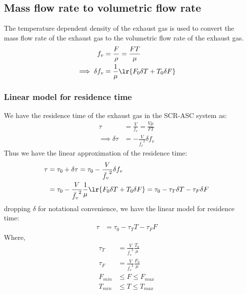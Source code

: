 \subsection{Mass flow rate to volumetric flow rate}
The temperature dependent density of the exhaust gas is used to convert the mass
flow rate of the exhaust gas to the volumetric flow rate of the exhaust gas.
\begin{align}
    f_v &= \frac{F}{\rho} = \frac{FT}{\mu}\\
    \implies \delta f_v &= \frac{1}{\mu} \lr{F_0 \delta T + T_0 \delta F}   \label{eqn::fv_approx}
\end{align}


\subsubsection{Linear model for residence time}
We have the residence time of the exhaust gas in the SCR-ASC system as:
\begin{align*}
    \tau &= \frac{V}{f_v} = \frac{V \mu}{FT} \\
    \implies
    \delta \tau &= - \frac{V}{\bar{f_v} ^2} \delta f_v
\end{align*}
Thus we have the linear approximation of the residence time:
\begin{align*}
    \tau &= \tau_0 + \delta \tau
          = \tau_0 - \frac{V}{\bar{f_v} ^2} \delta f_v\\
         &= \tau_0 - \frac{V}{\bar{f_v} ^2}  \frac{1}{\mu} \lr{F_0 \delta T + T_0 \delta F}
          = \tau_0 - \tau_T \delta T - \tau_F \delta F
\end{align*}
dropping $\delta$ for notational convenience, we have the linear model for residence time:
\begin{align}
    \tau &= \tau_0 - \tau_T T - \tau_F F
\end{align}
Where,
\begin{align*}
    \tau_T &= \frac{V}{\bar{f_v} ^2}  \frac{T_0}{\mu}\\
    \tau_F &= \frac{V}{\bar{f_v} ^2}  \frac{F_0}{\mu}\\
    F_{min} &\leq F \leq F_{max}\\
    T_{min} &\leq T \leq T_{max}
\end{align*}
